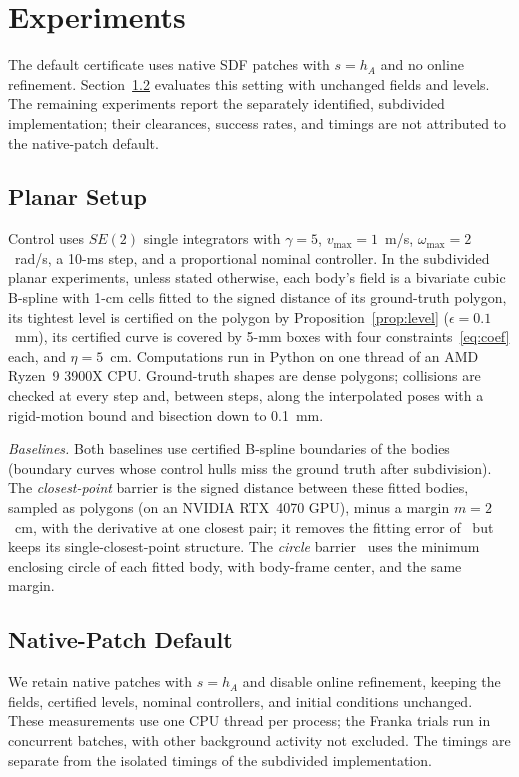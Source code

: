 \documentclass[journal]{IEEEtran}
\theoremstyle{definition}
\begin{document}
\section{Experiments}\label{sec:exp}

The default certificate uses native SDF patches with $s=h_A$ and no online refinement.
Section~\ref{sec:native} evaluates this setting with unchanged fields and levels.
The remaining experiments report the separately identified, subdivided implementation; their
clearances, success rates, and timings are not attributed to the native-patch default.

\subsection{Planar Setup}
Control uses $SE(2)$ single integrators with $\gamma=5$, $v_{\max}=1$~m/s, $\omega_{\max}=2$~rad/s,
a 10-ms step, and a proportional nominal controller. In the subdivided planar experiments,
unless stated otherwise, each body's field is a
bivariate cubic B-spline with 1-cm cells fitted to the signed distance of its ground-truth polygon,
its tightest level is certified on the polygon by Proposition~\ref{prop:level} ($\epsilon=0.1$~mm),
its certified curve is covered by 5-mm boxes with four constraints~\eqref{eq:coef} each, and
$\eta=5$~cm. Computations run in Python on one thread of an AMD Ryzen~9 3900X CPU. Ground-truth
shapes are dense polygons; collisions are checked at every step and, between steps, along the
interpolated poses with a rigid-motion bound and bisection down to 0.1~mm.

\emph{Baselines.} Both baselines use certified B-spline boundaries of the bodies~\cite{jo2027semantic}
(boundary curves whose control hulls miss the ground truth after subdivision). The \emph{closest-point}
barrier is the signed distance between these fitted bodies, sampled as polygons (on an NVIDIA RTX~4070
GPU), minus a margin $m=2$~cm, with the derivative at one closest pair; it removes the fitting error
of~\cite{jo2026geometry} but keeps its single-closest-point structure. The \emph{circle}
barrier~\cite{wang2017safety} uses the minimum enclosing circle of each fitted body, with body-frame
center, and the same margin.

\subsection{Native-Patch Default}\label{sec:native}
We retain native patches with $s=h_A$ and disable online refinement, keeping the fields,
certified levels, nominal controllers, and initial conditions unchanged. These measurements use
one CPU thread per process; the Franka trials run in concurrent batches, with other background
activity not excluded. The timings are separate from the isolated timings
of the subdivided implementation.
\end{document}
